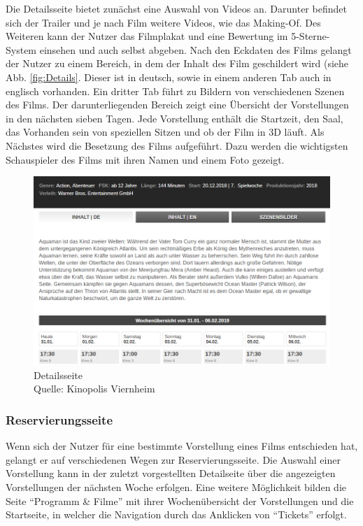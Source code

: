 	Die Detailsseite bietet zunächst eine Auswahl von Videos an. Darunter befindet sich der Trailer und je nach Film weitere Videos, wie das Making-Of. Des Weiteren kann der Nutzer das Filmplakat und eine Bewertung im 5-Sterne-System einsehen und auch selbst abgeben. Nach den Eckdaten des Films gelangt der Nutzer zu einem Bereich, in dem der Inhalt des Film geschildert wird (siehe Abb. \vref{fig:Details}. Dieser ist in deutsch, sowie in einem anderen Tab auch in englisch vorhanden. Ein dritter Tab führt zu Bildern von verschiedenen Szenen des Films. Der darunterliegenden Bereich zeigt eine Übersicht der Vorstellungen in den nächsten sieben Tagen. Jede Vorstellung enthält die Startzeit, den Saal, das Vorhanden sein von speziellen Sitzen und ob der Film in 3D läuft. Als Nächstes wird die Besetzung des Films aufgeführt. Dazu werden die wichtigsten Schauspieler des Films mit ihren Namen und einem Foto gezeigt.
	\begin{figure}[H]
		\centering 
		\includegraphics[width=14cm]{img/Detailsseite2.png}
		\captionsetup{format=hang}
		\centering\caption[Detailsseite]{\label{fig:Details}Detailsseite \\Quelle: Kinopolis Viernheim}
	\end{figure}  
	
	\subsubsection{Reservierungsseite}
	Wenn sich der Nutzer für eine bestimmte Vorstellung eines Films entschieden hat, gelangt er auf verschiedenen Wegen zur Reservierungsseite. Die Auswahl einer Vorstellung kann in der zuletzt vorgestellten Detailseite über die angezeigten Vorstellungen der nächsten Woche erfolgen. Eine weitere Möglichkeit bilden die Seite \enquote{Programm \& Filme} mit ihrer Wochenübersicht der Vorstellungen und die Startseite, in welcher die Navigation durch das Anklicken von \enquote{Tickets} erfolgt. 
	
